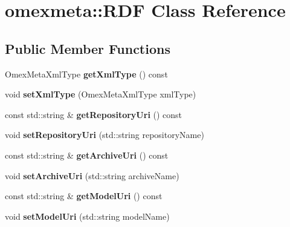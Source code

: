 \hypertarget{classomexmeta_1_1RDF}{}\section{omexmeta\+:\+:R\+DF Class Reference}
\label{classomexmeta_1_1RDF}
\subsection*{Public Member Functions}
\begin{DoxyCompactItemize}
\item 
\mbox{\label{classomexmeta_1_1RDF_a6979e6ca2688cf5cae1e9e1cf3a7309a}} 
Omex\+Meta\+Xml\+Type {\bfseries get\+Xml\+Type} () const
\item 
\mbox{\label{classomexmeta_1_1RDF_a8fc7b226619580fac47afce0a7ec2628}} 
void {\bfseries set\+Xml\+Type} (Omex\+Meta\+Xml\+Type xml\+Type)
\item 
\mbox{\label{classomexmeta_1_1RDF_a60b4a0a8c0c4f30a9cc71f9899bffabc}} 
const std\+::string \& {\bfseries get\+Repository\+Uri} () const
\item 
\mbox{\label{classomexmeta_1_1RDF_a9e8669ac5cf5dbcaf235f535f7482a7a}} 
void {\bfseries set\+Repository\+Uri} (std\+::string repository\+Name)
\item 
\mbox{\label{classomexmeta_1_1RDF_a1b3bd1292e77c1d87720f854ec5a04bd}} 
const std\+::string \& {\bfseries get\+Archive\+Uri} () const
\item 
\mbox{\label{classomexmeta_1_1RDF_a77ba0cbdb6070ac78f14044197d79cd8}} 
void {\bfseries set\+Archive\+Uri} (std\+::string archive\+Name)
\item 
\mbox{\label{classomexmeta_1_1RDF_ac579ac8b79eb7d374a9077114837d2ef}} 
const std\+::string \& {\bfseries get\+Model\+Uri} () const
\item 
\mbox{\label{classomexmeta_1_1RDF_ad5310903d0e1a7a7ee890478f18b6181}} 
void {\bfseries set\+Model\+Uri} (std\+::string model\+Name)
\item 

\end{DoxyCompactItemize}
